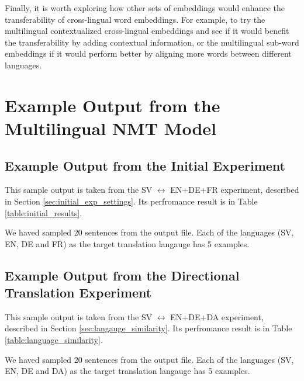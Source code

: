 \documentclass[thesis,fonts=libertine]{cluu}
\begin{document}
Finally, it is worth exploring how other sets of embeddings would enhance the transferability of cross-lingual word embeddings. For example, to try the multilingual contextualized cross-lingual embeddings \textcite{devlin-etal-2019-bert} and see if it would benefit the transferability by adding contextual information, or the multilingual sub-word embeddings \textcite{Heinzerling:2017aa} if it would perform better by aligning more words between different languages.

\appendix
\chapter{Example Output from the Multilingual NMT Model}
\label{chap:example_output}

\section{Example Output from the Initial Experiment}
\label{sec:initial_output}

This sample output is taken from the SV $\leftrightarrow$ EN+DE+FR experiment, described in Section \ref{sec:initial_exp_settings}. Its perfromance result is in Table \ref{table:initial_results}.

We haved sampled 20 sentences from the output file. Each of the languages (SV, EN, DE and FR) as the target translation langauge has 5 examples.



\section{Example Output from the Directional Translation Experiment}
\label{sec:directional_output}

This sample output is taken from the SV $\leftrightarrow$ EN+DE+DA experiment, described in Section \ref{sec:langauge_similarity}. Its perfromance result is in Table \ref{table:language_similarity}.

We haved sampled 20 sentences from the output file. Each of the languages (SV, EN, DE and DA) as the target translation langauge has 5 examples.



\printbibliography
\end{document}
